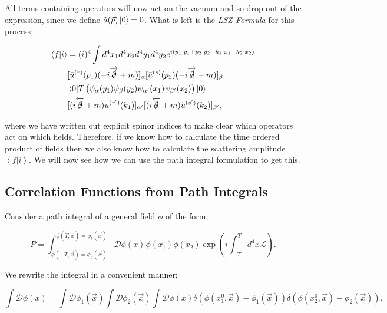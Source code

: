 All terms containing operators will now act on the vacuum and so drop out of the expression, since we define $\hat{a}(\vec{p}) \mathinner{\lvert0\rangle}_{\hspace{-0.1em}} = 0$. What is left is the \emph{LSZ Formula} for this process;

\begin{equation}
\label{LSZform}
\begin{split}
\left<f | i\right> &= (i)^4 \int d^4 x_1 d^4 x_2 d^4 y_1 d^4 y_2 e^{i(p_1 \cdot y_1 + p_2 \cdot y_2 - k_1 \cdot x_1 - k_2 \cdot x_2)} \\
& [\bar{u}^{(r)}(p_1)(- i \overrightarrow{\slashed{\partial}} + m)]_\alpha [\bar{u}^{(s)}(p_2)(- i \overrightarrow{\slashed{\partial}} + m)]_\beta \\
& \mathinner{\langle0\vert T \left(\bar{\psi}_\alpha(y_1) \bar{\psi}_\beta(y_2) \psi_{\alpha'}(x_1) \psi_{\beta'}(x_2) \right)\vert0\rangle}_{} \\
& [(i \overleftarrow{\slashed{\partial}} + m)u^{(r')}(k_1)]_{\alpha' }[(i \overleftarrow{\slashed{\partial}} + m)u^{(s')}(k_2)]_{\beta'},
\end{split}
\end{equation}

where we have written out explicit spinor indices to make clear which operators act on which fields. Therefore, if we know how to calculate the time ordered product of fields then we also know how to calculate the scattering amplitude $\left<f | i \right>$.  We will now see how we can use the path integral formulation to get this.

\subsection{Correlation Functions from Path Integrals}

Consider a path integral of a general field $\phi$ of the form;

\begin{equation}
P = \int^{\phi(T, \vec{x}) = \phi_b(\vec{x})}_{\phi(-T, \vec{x}) = \phi_a(\vec{x})} \mathcal{D} \phi(x) \hspace{1pt}  \phi(x_1) \phi(x_2) \exp \left( i \int_{-T}^T d^4 x \hspace{1pt} \mathscr{L} \right).
\end{equation}

We rewrite the integral in a convenient manner;

\begin{equation}
\int \mathcal{D} \phi(x) = \int \mathcal{D}\phi_1(\vec{x}) \int \mathcal{D} \phi_2 (\vec{x}) \int \mathcal{D} \phi(x) \delta(\phi(x_1^0, \vec{x}) - \phi_1(\vec{x})) \delta(\phi(x_2^0, \vec{x}) - \phi_2(\vec{x})).
\end{equation}

